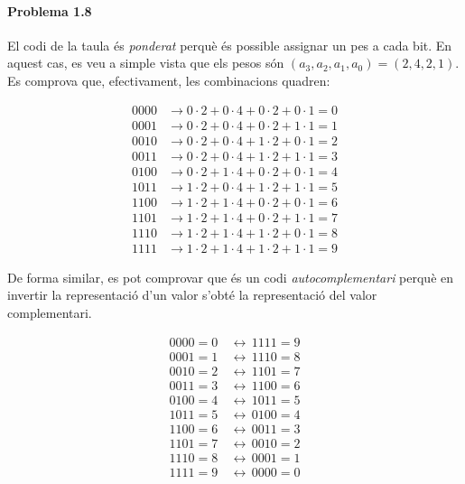 \documentclass[catalan,border=15pt,class=scrartcl,multi=minipage]{standalone}
\begin{document}
\begin{minipage}{30em}

\paragraph{Problema 1.8}

El codi de la taula és \emph{ponderat} perquè és possible assignar un pes a cada bit.
En aquest cas, es veu a simple vista que els pesos són $\left(a_3, a_2, a_1, a_0\right) = \left(2, 4, 2, 1\right)$.
Es comprova que, efectivament, les combinacions quadren:

\begin{align*}
  0000 &\rightarrow 0 \cdot 2 + 0 \cdot 4 + 0 \cdot 2 + 0 \cdot 1 = 0 \\
  0001 &\rightarrow 0 \cdot 2 + 0 \cdot 4 + 0 \cdot 2 + 1 \cdot 1 = 1 \\
  0010 &\rightarrow 0 \cdot 2 + 0 \cdot 4 + 1 \cdot 2 + 0 \cdot 1 = 2 \\
  0011 &\rightarrow 0 \cdot 2 + 0 \cdot 4 + 1 \cdot 2 + 1 \cdot 1 = 3 \\
  0100 &\rightarrow 0 \cdot 2 + 1 \cdot 4 + 0 \cdot 2 + 0 \cdot 1 = 4 \\
  1011 &\rightarrow 1 \cdot 2 + 0 \cdot 4 + 1 \cdot 2 + 1 \cdot 1 = 5 \\
  1100 &\rightarrow 1 \cdot 2 + 1 \cdot 4 + 0 \cdot 2 + 0 \cdot 1 = 6 \\
  1101 &\rightarrow 1 \cdot 2 + 1 \cdot 4 + 0 \cdot 2 + 1 \cdot 1 = 7 \\
  1110 &\rightarrow 1 \cdot 2 + 1 \cdot 4 + 1 \cdot 2 + 0 \cdot 1 = 8 \\
  1111 &\rightarrow 1 \cdot 2 + 1 \cdot 4 + 1 \cdot 2 + 1 \cdot 1 = 9
\end{align*}

De forma similar, es pot comprovar que és un codi \emph{autocomplementari} perquè
en invertir la representació d'un valor s'obté la representació del valor complementari.

\begin{align*}
  0000 = 0 \, &\leftrightarrow \, 1111 = 9 \\
  0001 = 1 \, &\leftrightarrow \, 1110 = 8 \\
  0010 = 2 \, &\leftrightarrow \, 1101 = 7 \\
  0011 = 3 \, &\leftrightarrow \, 1100 = 6 \\
  0100 = 4 \, &\leftrightarrow \, 1011 = 5 \\
  1011 = 5 \, &\leftrightarrow \, 0100 = 4 \\
  1100 = 6 \, &\leftrightarrow \, 0011 = 3 \\
  1101 = 7 \, &\leftrightarrow \, 0010 = 2 \\
  1110 = 8 \, &\leftrightarrow \, 0001 = 1 \\
  1111 = 9 \, &\leftrightarrow \, 0000 = 0
\end{align*}

\end{minipage}
\end{document}
